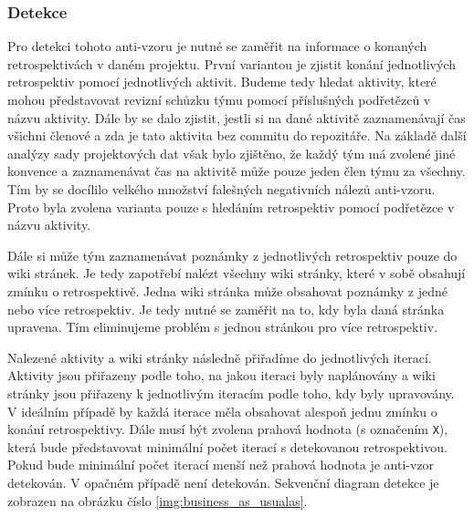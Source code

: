 \documentclass[czech,DP]{thesiskiv}
\begin{document}
\subsubsection{Detekce}
Pro detekci tohoto anti-vzoru je nutné se zaměřit na informace o konaných retrospektivách v daném projektu. První variantou je zjistit konání jednotlivých retrospektiv pomocí jednotlivých aktivit. Budeme tedy hledat aktivity, které mohou představovat revizní schůzku týmu pomocí příslušných podřetězců v názvu aktivity. Dále by se dalo zjistit, jestli si na dané aktivitě zaznamenávají čas všichni členové a zda je tato aktivita bez commitu do repozitáře. Na základě další analýzy sady projektových dat však bylo zjištěno, že každý tým má zvolené jiné konvence a zaznamenávat čas na aktivitě může pouze jeden člen týmu za všechny. Tím by se docílilo velkého množství falešných negativních nálezů anti-vzoru. Proto byla zvolena varianta pouze s hledáním retrospektiv pomocí podřetězce v názvu aktivity.
\par
Dále si může tým zaznamenávat poznámky z jednotlivých retrospektiv pouze do wiki stránek. Je tedy zapotřebí nalézt všechny wiki stránky, které v sobě obsahují zmínku o retrospektivě. Jedna wiki stránka může obsahovat poznámky z jedné nebo více retrospektiv. Je tedy nutné se zaměřit na to, kdy byla daná stránka upravena. Tím eliminujeme problém s jednou stránkou pro více retrospektiv.
\par
Nalezené aktivity a wiki stránky následně přiřadíme do jednotlivých iterací. Aktivity jsou přiřazeny podle toho, na jakou iteraci byly naplánovány a wiki stránky jsou přiřazeny k jednotlivým iteracím podle toho, kdy byly upravovány. V ideálním případě by každá iterace měla obsahovat alespoň jednu zmínku o konání retrospektivy. Dále musí být zvolena prahová hodnota (s označením \texttt{X}), která bude představovat minimální počet iterací s detekovanou retrospektivou. Pokud bude minimální počet iterací menší než prahová hodnota je anti-vzor detekován. V opačném případě není detekován. Sekvenční diagram detekce je zobrazen na obrázku číslo \ref{img:business_as_usualas}.
\end{document}
